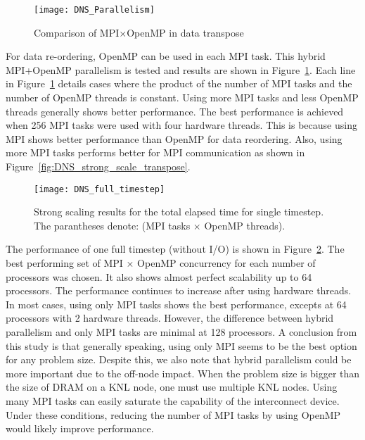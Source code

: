\begin{figure}
 \begin{center}
   \texttt{[image: DNS\_Parallelism]}
   \caption{Comparison of MPI$\times$OpenMP in data transpose}
   \label{fig:DNS_MPI_OpenMP}
 \end{center}
\end{figure}


For data re-ordering, OpenMP can be used in each MPI task. This hybrid MPI+OpenMP parallelism
is tested and results are shown in Figure~\ref{fig:DNS_MPI_OpenMP}.
Each line in Figure~\ref{fig:DNS_MPI_OpenMP} details cases where the product of
the number of MPI tasks and the number of OpenMP threads is
constant. Using more MPI tasks and less OpenMP threads generally shows
better performance. The best performance is achieved when 256 MPI tasks
were used with four hardware threads. This is because using MPI shows
better performance than OpenMP for data reordering. Also, using more MPI
tasks performs better for MPI communication as shown in
Figure~\ref{fig:DNS_strong_scale_transpose}.


\begin{figure}
 \begin{center}
   \texttt{[image: DNS\_full\_timestep]}
   \caption{Strong scaling results for the total elapsed time for single timestep. The parantheses denote: (MPI tasks $\times$ OpenMP threads).}
   \label{fig:DNS_strong_scale_total_elapsed_time}
 \end{center}
\end{figure}

The performance of one full timestep (without I/O) is shown in
Figure~\ref{fig:DNS_strong_scale_total_elapsed_time}. The best
performing set of MPI $\times$ OpenMP concurrency for each number of
processors was chosen. It also shows almost perfect scalability up to 64
processors. The performance continues to increase after using hardware
threads. In most cases, using only MPI tasks shows the best performance,
excepts at 64 processors with 2 hardware threads. However, the
difference between hybrid parallelism and only MPI tasks are minimal at
128 processors. A conclusion from this study is that generally speaking,
using only MPI seems to be the best option for any problem size.
Despite this, we also note that hybrid parallelism could be more
important due to the off-node impact. When the problem size
is bigger than the size of DRAM on a KNL node, one must use multiple KNL
nodes. Using many MPI tasks can easily saturate the capability of
the interconnect device. Under these conditions, reducing the number of MPI tasks
by using OpenMP would likely improve performance.

